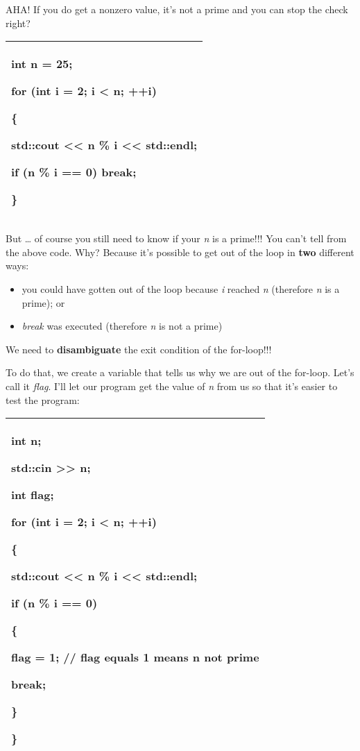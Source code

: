\documentclass[
]{article}
\providecommand{\tightlist}{%
  \setlength{\itemsep}{0pt}\setlength{\parskip}{0pt}}
\begin{document}
AHA! If you do get a nonzero value, it's not a prime and you can stop
the check right?

\begin{longtable}[]{@{}l@{}}
\toprule
\endhead
\begin{minipage}[t]{0.97\columnwidth}\raggedright
int n = 25;

for (int i = 2; i \textless{} n; ++i)

\{

std::cout \textless\textless{} n \% i \textless\textless{} std::endl;

if (n \% i == 0) break;

\}\strut
\end{minipage}\tabularnewline
\bottomrule
\end{longtable}

But \ldots{} of course you still need to know if your \emph{n} is a
prime!!! You can't tell from the above code. Why? Because it's possible
to get out of the loop in \textbf{two} different ways:

\begin{itemize}
\tightlist
\item
  you could have gotten out of the loop because \emph{i} reached
  \emph{n} (therefore \emph{n} is a prime); or
\item
  \emph{break} was executed (therefore \emph{n} is not a prime)
\end{itemize}

We need to \textbf{disambiguate} the exit condition of the for-loop!!!

To do that, we create a variable that tells us why we are out of the
for-loop. Let's call it \emph{flag}. I'll let our program get the value
of \emph{n} from us so that it's easier to test the program:

\begin{longtable}[]{@{}l@{}}
\toprule
\endhead
\begin{minipage}[t]{0.97\columnwidth}\raggedright
int n;

std::cin \textgreater\textgreater{} n;

int flag;

for (int i = 2; i \textless{} n; ++i)

\{

std::cout \textless\textless{} n \% i \textless\textless{} std::endl;

if (n \% i == 0)

\{

flag = 1; // flag equals 1 means n not prime

break;

\}

\}\strut
\end{minipage}\tabularnewline
\bottomrule
\end{longtable}
\end{document}
